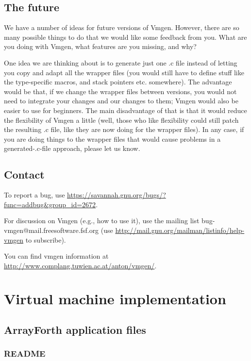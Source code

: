 \documentclass[10pt,english]{article}
\begin{document}
\subsection{The future}

We have a number of ideas for future versions of Vmgen. However, there
are so many possible things to do that we would like some feedback
from you. What are you doing with Vmgen, what features are you missing,
and why?

One idea we are thinking about is to generate just one .c file instead
of letting you copy and adapt all the wrapper files (you would still
have to define stuff like the type-specific macros, and stack pointers
etc. somewhere). The advantage would be that, if we change the wrapper
files between versions, you would not need to integrate your changes
and our changes to them; Vmgen would also be easier to use for beginners.
The main disadvantage of that is that it would reduce the flexibility
of Vmgen a little (well, those who like flexibility could still patch
the resulting .c file, like they are now doing for the wrapper files).
In any case, if you are doing things to the wrapper files that would
cause problems in a generated-.c-file approach, please let us know.


\subsection{Contact\label{sub:Contact}}

To report a bug, use \url{https://savannah.gnu.org/bugs/?func=addbug&group_id=2672}.

For discussion on Vmgen (e.g., how to use it), use the mailing list
bug-vmgen@mail.freesoftware.fsf.org (use \url{http://mail.gnu.org/mailman/listinfo/help-vmgen}
to subscribe).

You can find vmgen information at \url{http://www.complang.tuwien.ac.at/anton/vmgen/}.


\section{Virtual machine implementation}


\subsection{ArrayForth application files}


\subsubsection{README}
\end{document}

